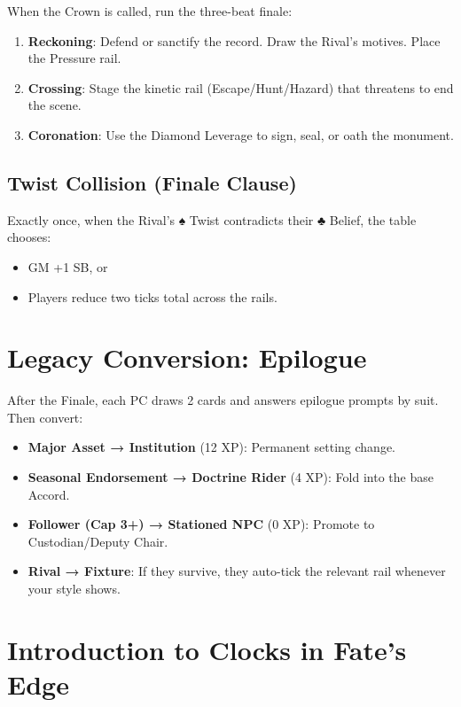 When the Crown is called, run the three-beat finale:

\begin{enumerate}
    \item \textbf{Reckoning}: Defend or sanctify the record. Draw the Rival's motives. Place the Pressure rail.
    \item \textbf{Crossing}: Stage the kinetic rail (Escape/Hunt/Hazard) that threatens to end the scene.
    \item \textbf{Coronation}: Use the Diamond Leverage to sign, seal, or oath the monument.
\end{enumerate}

\subsection*{Twist Collision (Finale Clause)}

Exactly once, when the Rival's ♠ Twist contradicts their ♣ Belief, the table chooses:

\begin{itemize}
    \item GM +1 SB, or
    \item Players reduce two ticks total across the rails.
\end{itemize}

\section*{Legacy Conversion: Epilogue}

After the Finale, each PC draws 2 cards and answers epilogue prompts by suit. Then convert:

\begin{itemize}
    \item \textbf{Major Asset → Institution} (12 XP): Permanent setting change.
    \item \textbf{Seasonal Endorsement → Doctrine Rider} (4 XP): Fold into the base Accord.
    \item \textbf{Follower (Cap 3+) → Stationed NPC} (0 XP): Promote to Custodian/Deputy Chair.
    \item \textbf{Rival → Fixture}: If they survive, they auto-tick the relevant rail whenever your style shows.
\end{itemize}

\section*{Introduction to Clocks in Fate's Edge}

